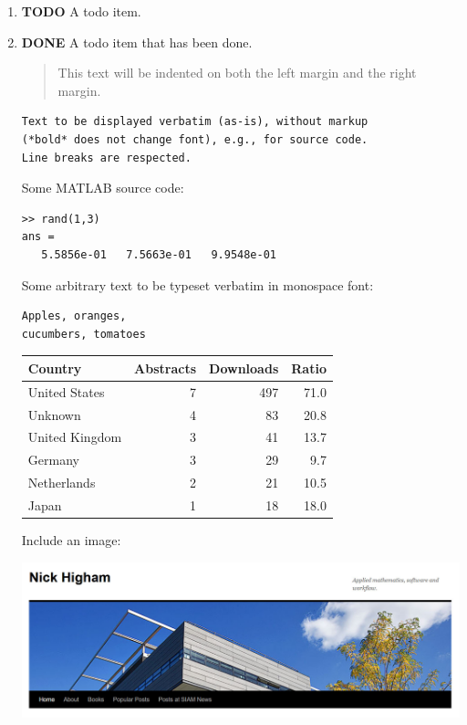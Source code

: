 \documentclass[11pt]{article}
\begin{document}
\begin{enumerate}
\item {\bfseries\sffamily TODO} A todo item.
\label{sec:org0d9137d}
\item {\bfseries\sffamily DONE} A todo item that has been done.
\label{sec:orge343ed2}

\begin{quote}
This text will be indented on both the left margin and the right margin.
\end{quote}

\begin{verbatim}
Text to be displayed verbatim (as-is), without markup 
(*bold* does not change font), e.g., for source code. 
Line breaks are respected. 
\end{verbatim}

Some MATLAB source code:
\begin{verbatim}
>> rand(1,3)
ans =
   5.5856e-01   7.5663e-01   9.9548e-01
\end{verbatim}

Some arbitrary text to be typeset verbatim in monospace font:
\begin{verbatim}
Apples, oranges,
cucumbers, tomatoes
\end{verbatim}

\begin{center}
\begin{tabular}{lrrr}
\hline
Country & Abstracts & Downloads & Ratio\\
\hline
United States & 7 & 497 & 71.0\\
Unknown & 4 & 83 & 20.8\\
United Kingdom & 3 & 41 & 13.7\\
Germany & 3 & 29 & 9.7\\
Netherlands & 2 & 21 & 10.5\\
Japan & 1 & 18 & 18.0\\
\hline
\end{tabular}
\end{center}

Include an image:
\begin{center}
\includegraphics[width=.9\linewidth]{nickhighamwordpress.jpg}
\end{center}
\end{enumerate}
\end{document}
